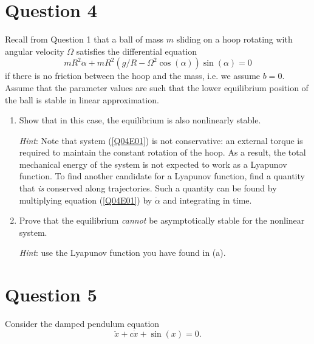 \documentclass[twoside,10pt,a4paper]{article}
\begin{document}
\section*{Question 4}
Recall from Question 1 that a ball of mass $m$ sliding on a hoop rotating with angular velocity $\Omega$ satisfies the differential equation
\begin{equation}\label{Q04E01}
	mR^2 \ddot{\alpha} + mR^2(g/R - \Omega^2 \cos(\alpha)) \sin(\alpha) = 0
\end{equation}
if there is no friction between the hoop and the mass, i.e. we assume $b=0$. 
 Assume that the parameter values are such that the lower equilibrium position of the ball is stable in linear approximation.

\begin{enumerate}[label=(\alph*)]
	\item Show that in this case, the equilibrium is also nonlinearly stable. 
	
	\textit{Hint}: Note that system (\ref{Q04E01}) is not conservative: an external torque is required to maintain the constant rotation of the hoop. As a result, the total mechanical energy of the system is not expected to work as a Lyapunov function. To find another candidate for a Lyapunov function, find a quantity that \textit{is} conserved along trajectories. Such a quantity can be found by multiplying equation (\ref{Q04E01}) by $\dot{\alpha}$ and integrating in time.
	\item Prove that the equilibrium \textit{cannot} be asymptotically stable for the nonlinear system.
	
	\textit{Hint}: use the Lyapunov function you have found in (a).
\end{enumerate}

\section*{Question 5}
Consider the damped pendulum equation
\begin{equation}\label{Q05E01}
	\ddot{x} + c\dot{x} + \sin(x) = 0.
\end{equation}
\end{document}

